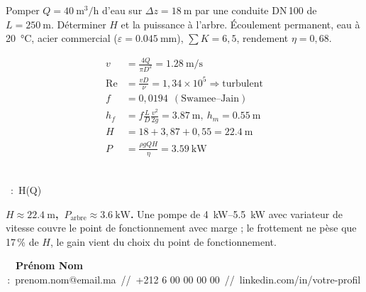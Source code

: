 \documentclass[10pt]{article}
\makeatletter
\newcommand{\jname}{Prénom Nom}\newcommand{\jmail}{prenom.nom@email.ma}
\newcommand{\jlink}{linkedin.com/in/votre-profil}\newcommand{\jtel}{+212 6 00 00 00 00}
\makeatother
\begin{document}
\astatus{\sRealistic}{\sHonest}
Pomper $Q=\SI{40}{\meter\cubed\per\hour}$ d'eau sur $\Delta z=\SI{18}{\meter}$ par une conduite DN\,100 de $L=\SI{250}{\meter}$. Déterminer $H$ et la puissance à l'arbre.
Écoulement permanent, eau à \SI{20}{\celsius}, acier commercial ($\varepsilon=\SI{0.045}{\milli\meter}$), $\sum K=6{,}5$, rendement $\eta=0{,}68$.
\begin{minipage}[t]{0.5\textwidth}\vspace{0pt}\small
\begin{align*}
v&=\tfrac{4Q}{\pi D^{2}}=\SI{1.28}{\meter\per\second}\\
\mathrm{Re}&=\tfrac{vD}{\nu}=1{,}34\!\times\!10^{5}\Rightarrow\text{turbulent}\\
f&=0{,}0194\ \ (\text{Swamee--Jain})\\
h_f&=f\tfrac{L}{D}\tfrac{v^{2}}{2g}=\SI{3.87}{\meter},\ h_m=\SI{0.55}{\meter}\\
H&=18+3{,}87+0{,}55=\SI{22.4}{\meter}\\
P&=\tfrac{\rho g Q H}{\eta}=\SI{3.59}{\kilo\watt}
\end{align*}\end{minipage}\hfill
\begin{minipage}[t]{0.46\textwidth}\vspace{0pt}\centering
{}\\[-1pt]{\monofont\tiny\MakeUppercase{\sFigure}\ :\ H(Q)}
\end{minipage}
\colorbox{ink}{\parbox{\dimexpr\textwidth-2\fboxsep}{\color{paper}\small\textbf{$H\approx\SI{22.4}{\meter}$,\ $P_{\text{arbre}}\approx\SI{3.6}{\kilo\watt}$.} Une pompe de \SIrange{4}{5.5}{\kilo\watt} avec variateur de vitesse couvre le point de fonctionnement avec marge ; le frottement ne pèse que 17\,\% de $H$, le gain vient du choix du point de fonctionnement.}}
\vfill
{\monofont\color{orange}\scriptsize\MakeUppercase{\sWho}}\ \ {\bfseries\jname}\\
{\monofont\scriptsize\MakeUppercase{\sContact}\,:\ \jmail\ //\ \jtel\ //\ \jlink}
\end{document}

